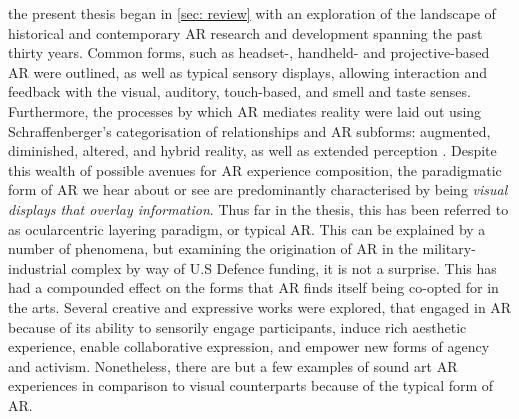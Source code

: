the present thesis began in \autoref{sec: review} with an exploration of the landscape of historical and contemporary AR research and development spanning the past thirty years. Common forms, such as headset-, handheld- and projective-based AR were outlined, as well as typical sensory displays, allowing interaction and feedback with the visual, auditory, touch-based, and smell and taste senses. Furthermore, the processes by which AR mediates reality were laid out using Schraffenberger's categorisation of relationships and AR subforms: augmented, diminished, altered, and hybrid reality, as well as extended perception \citep{schraffenberger2018}. Despite this wealth of possible avenues for AR experience composition, the paradigmatic form of AR we hear about or see are predominantly characterised by being \textit{visual displays that overlay information}. Thus far in the thesis, this has been referred to as ocularcentric layering paradigm, or typical AR. This can be explained by a number of phenomena, but examining the origination of AR in the military-industrial complex by way of U.S Defence funding, it is not a surprise. This has had a compounded effect on the forms that AR finds itself being co-opted for in the arts. Several creative and expressive works were explored, that engaged in AR because of its ability to sensorily engage participants, induce rich aesthetic experience, enable collaborative expression, and empower new forms of agency and activism. Nonetheless, there are but a few examples of sound art AR experiences in comparison to visual counterparts because of the typical form of AR.

